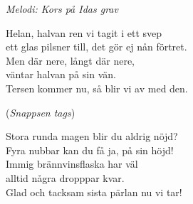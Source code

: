 {\footnotesize\textit{Melodi: Kors på Idas grav}}\par
\vspace{10pt}
Helan, halvan ren vi tagit i ett svep\\
ett glas pilsner till, det gör ej nån förtret.\\
Men där nere, långt där nere,\\
väntar halvan på sin vän.\\
Tersen kommer nu, så blir vi av med den.\par
\vspace{10pt}
(\textit{Snappsen tags})\par
\vspace{10pt}
Stora runda magen blir du aldrig nöjd?\\
Fyra nubbar kan du få ja, på sin höjd!\\
Immig brännvinsflaska har väl\\
alltid några dropppar kvar.\\
Glad och tacksam sista pärlan nu vi tar!